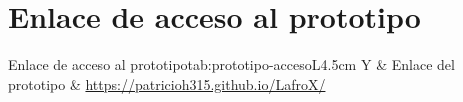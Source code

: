 \documentclass[carta,firma]{lafrox}
\begin{document}
\portadalafrox

\chapter{Enlace de acceso al prototipo}

\begin{tablalafrox}{Enlace de acceso al prototipo}{tab:prototipo-acceso}{L{4.5cm} Y}
  { & }
  Enlace del prototipo & \url{https://patricioh315.github.io/LafroX/} \\
\end{tablalafrox}
\end{document}
